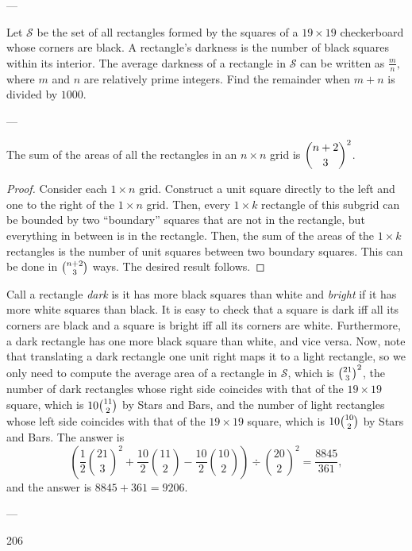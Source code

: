 
---

Let $\mathcal{S}$ be the set of all rectangles formed by the squares of a $19 \times 19$ checkerboard whose corners are black$.$ A rectangle's darkness is the number of black squares within its interior$.$ The average darkness of a rectangle in $\mathcal{S}$ can be written as $\tfrac mn,$ where  $m$ and $n$ are relatively prime integers$.$ Find the remainder when $m+n$ is divided by $1000$.

---

\begin{boxlemma*}
    The sum of the areas of all the rectangles in an $n\times n$ grid is $\dbinom{n+2}3^2$.
\end{boxlemma*}
\begin{proof}
    Consider each $1\times n$ grid. Construct a unit square directly to the left and one to the right of the $1\times n$ grid. Then, every $1\times k$ rectangle of this subgrid can be bounded by two ``boundary'' squares that are not in the rectangle, but everything in between is in the rectangle. Then, the sum of the areas of the $1\times k$ rectangles is the number of unit squares between two boundary squares. This can be done in $\tbinom{n+2}3$ ways. The desired result follows.
\end{proof}

Call a rectangle \textit{dark} is it has more black squares than white and \textit{bright} if it has more white squares than black. It is easy to check that a square is dark iff all its corners are black and a square is bright iff all its corners are white. Furthermore, a dark rectangle has one more black square than white, and vice versa. Now, note that translating a dark rectangle one unit right maps it to a light rectangle, so we only need to compute the average area of a rectangle in $\mathcal{S}$, which is $\tbinom{21}3^2$, the number of dark rectangles whose right side coincides with that of the $19\times 19$ square, which is $10\tbinom{11}2$ by Stars and Bars, and the number of light rectangles whose left side coincides with that of the $19\times 19$ square, which is $10\tbinom{10}2$ by Stars and Bars. The answer is $$\left(\frac12\binom{21}3^2+\frac{10}2\binom{11}2-\frac{10}2\binom{10}2\right)\div\binom{20}2^2=\frac{8845}{361},$$
and the answer is $8845+361=9206$.

---

206
